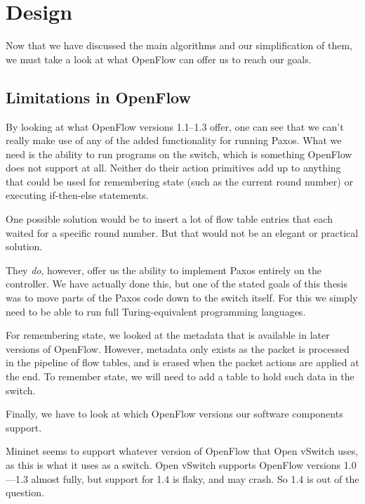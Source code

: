 \chapter{Design}
\label{chapter:design}

Now that we have discussed the main algorithms and our simplification of
them, we must take a look at what OpenFlow can offer us to reach our goals.



\section{Limitations in OpenFlow}

By looking at what OpenFlow versions 1.1--1.3 offer,
one can see that we can't really make use of any of the added functionality
for running Paxos.  What we need is the ability to run programs on the
switch, which is something OpenFlow does not support at all.  Neither do
their action primitives add up to anything that could be used for
remembering state (such as the current round number) or executing
if-then-else statements.

One possible solution would be to insert a lot of flow table entries that
each waited for a specific round number.  But that would not be an elegant
or practical solution.

They \textit{do}, however, offer us the ability to implement Paxos entirely
on the controller.  We have actually done this, but one of the stated goals
of this thesis was to move parts of the Paxos code down to the switch
itself.  For this we simply need to be able to run full Turing-equivalent
programming languages.

For remembering state, we looked at the metadata
that is available in later versions of OpenFlow.  However, metadata only
exists as the packet is processed in the pipeline of flow tables, and is
erased when the packet actions are applied at the end.  To remember state,
we will need to add a table to hold such data in the switch.

Finally, we have to look at which OpenFlow versions our software components
support.

Mininet seems to support whatever version of OpenFlow that Open vSwitch uses,
as this is what it uses as a switch.  Open vSwitch
supports OpenFlow versions 1.0---1.3
almost fully, but support for 1.4 is flaky, and may crash.  So 1.4 is out of the question.

